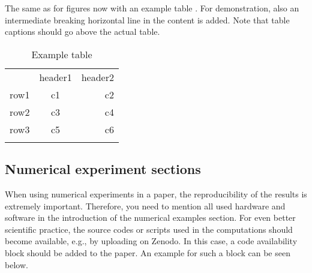 \documentclass[%
  a4paper,
  twocolumn,
  colorlinks,
]{preprint}
\begin{document}
The same as for figures now with an example table .
For demonstration, also an intermediate breaking horizontal line in the content
is added.
Note that table captions should go above the actual table.

\begin{table}[t]
  \centering
  \caption{Example table}
  \label{tab:example}

  \begin{tabular}{lcr}
    \hline\noalign{\medskip}
    & header1 & header2\\
    \noalign{\smallskip}\hline\noalign{\medskip}
    row1 & c1 & c2 \\
    row2 & c3 & c4 \\
    \noalign{\smallskip}\hline\noalign{\medskip}
    row3 & c5 & c6 \\
    \noalign{\medskip}\hline\noalign{\smallskip}
  \end{tabular}
\end{table}


\subsection{Numerical experiment sections}%
\label{subsec:numexp}

When using numerical experiments in a paper, the reproducibility of the
results is extremely important.
Therefore, you need to mention all used hardware and software in the
introduction of the numerical examples section.
For even better scientific practice, the source codes or scripts used in the
computations should become available, e.g., by uploading on Zenodo.
In this case, a code availability block should be added to the paper.
An example for such a block can be seen below.

\begin{center}%
  \setlength{\fboxsep}{5pt}%
\end{center}
\end{document}
